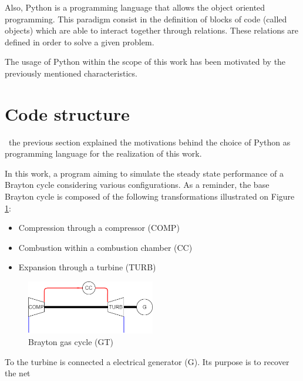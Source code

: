 Also, Python is a programming language that allows the object oriented programming. This paradigm consist in the definition of blocks of code (called objects) which are able to interact together through relations. These relations are defined in order to solve a given problem.

The usage of Python within the scope of this work has been motivated by the previously mentioned characteristics.

\section{Code structure}
\quad\, the previous section explained the motivations behind the choice of Python as programming language for the realization of this work.

In this work, a program aiming to simulate the steady state performance of a Brayton cycle considering various configurations. As a reminder, the base Brayton cycle is composed of the following transformations illustrated on Figure \ref{fig:C4_Brayton}:

\begin{itemize}
\item Compression through a compressor (COMP)
\item Combustion within a combustion chamber (CC)
\item Expansion through a turbine (TURB)
\end{itemize}

\begin{figure}[h]
\centering
\includegraphics[width=0.5\textwidth]{GT}
\caption{Brayton gas cycle (GT)}
\label{fig:C4_Brayton}
\end{figure}
To the turbine is connected a electrical generator (G). Its purpose is to recover the net 